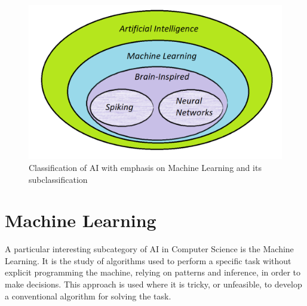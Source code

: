 \begin{figure}[H]
\centering
\captionsetup{justification=centering}
\includegraphics[scale=0.5]{./figure/ai_division.PNG}
\caption{Classification of AI with emphasis on Machine Learning and its subclassification}
\label{fig:aidiv}
\end{figure}

\section{Machine Learning}
A particular interesting subcategory of AI in Computer Science is the Machine Learning. It is the study of algorithms used to perform a specific task without explicit programming the machine, relying on patterns and inference, in order to make decisions. This approach is used where it is tricky, or unfeasible, to develop a conventional algorithm for solving the task.\\

